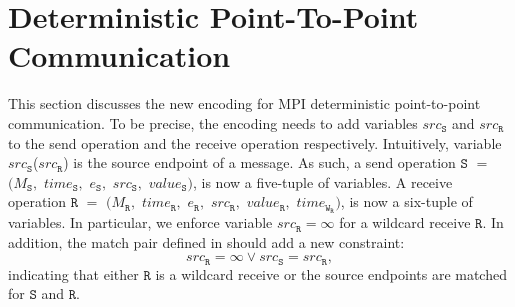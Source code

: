 \section{Deterministic Point-To-Point Communication}
This section discusses the new encoding for MPI deterministic point-to-point communication. To be precise, the encoding needs to add variables  $src_\mathtt{S}$ and $src_\mathtt{R}$ to the send operation and the receive operation respectively. Intuitively, variable $src_\mathtt{S}$($src_\mathtt{R}$) is the source endpoint of a message. As such, a send operation $\mathtt{S}$ $=$ $(M_\mathtt{S},$ $\mathit{time}_\mathtt{S},$ $e_\mathtt{S},$ $src_\mathtt{S},$ $\mathit{value}_\mathtt{S})$,  is now a five-tuple of variables. A receive operation $\mathtt{R}$ $=$ $(M_\mathtt{R},$ $\mathit{time}_\mathtt{R},$ $e_\mathtt{R},$ $src_\mathtt{R},$ $\mathit{value}_\mathtt{R},$ $\mathit{time}_{\mathtt{W}_\mathtt{R}})$, is now a six-tuple of variables. In particular, we enforce variable $src_\mathtt{R} = \infty$ for a wildcard receive $\mathtt{R}$. In addition, the match pair defined in  should add a new constraint: 
\[
src_\mathtt{R} = \infty \vee src_\mathtt{S} = src_\mathtt{R}, 
\]
indicating that either $\mathtt{R}$ is a wildcard receive or the source endpoints are matched for $\mathtt{S}$ and $\mathtt{R}$.